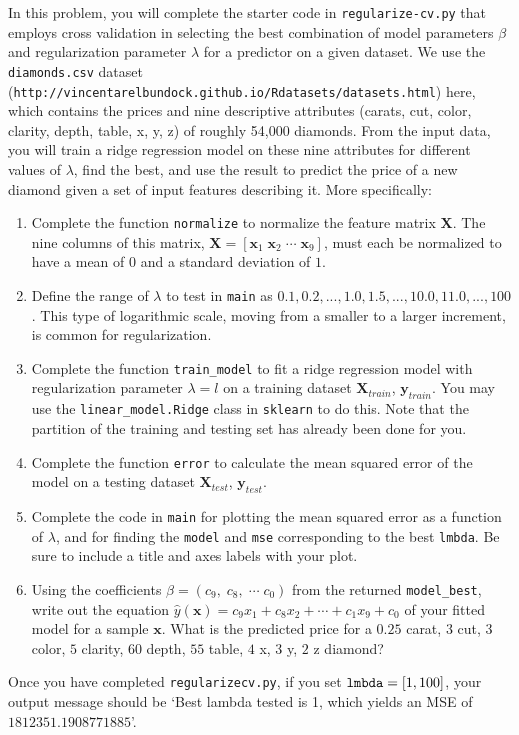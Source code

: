 \documentclass[10pt]{article}
\begin{document}
In this problem, you will complete the starter code in {\tt regularize-cv.py} that employs cross validation in selecting the best combination of model parameters $\beta$ and regularization parameter $\lambda$ for a predictor on a given dataset. We use the {\tt diamonds.csv} dataset ({\tt http://vincentarelbundock.github.io/Rdatasets/datasets.html}) here, which contains the prices and nine descriptive attributes (carats, cut, color, clarity, depth, table, x, y, z) of roughly 54,000 diamonds. From the input data, you will train a ridge regression model on these nine attributes for different values of $\lambda$, find the best, and use the result to predict the price of a new diamond given a set of input features describing it. More specifically:
\begin{enumerate}
\item Complete the function {\tt normalize} to normalize the feature matrix $\mathbf{X}$. The nine columns of this matrix, $\mathbf{X} = [\mathbf{x}_1 \; \mathbf{x}_2 \; \cdots \; \mathbf{x}_9]$, must each be normalized to have a mean of $0$ and a standard deviation of $1$.

\item Define the range of $\lambda$ to test in {\tt main} as $0.1, 0.2, ..., 1.0, 1.5, ..., 10.0, 11.0, ..., 100$. This type of logarithmic scale, moving from a smaller to a larger increment, is common for regularization.

\item Complete the function {\tt train\_model} to fit a ridge regression model with regularization parameter $\lambda = l$ on a training dataset $\mathbf{X}_{train}$, $\mathbf{y}_{train}$. You may use the {\tt linear\_model.Ridge} class in {\tt sklearn} to do this. Note that the partition of the training and testing set has already been done for you.

\item Complete the function {\tt error} to calculate the mean squared error of the model on a testing dataset $\mathbf{X}_{test}$, $\mathbf{y}_{test}$. 

\item Complete the code in {\tt main} for plotting the mean squared error as a function of $\lambda$, and for finding the {\tt model} and {\tt mse} corresponding to the best {\tt lmbda}. Be sure to include a title and axes labels with your plot.

\item Using the coefficients $\beta = (c_9, \;c_8, \; \cdots \; c_0)$ from the returned {\tt model\_best}, write out the equation $\hat{y}(\mathbf{x}) = c_9 x_1 + c_8 x_2 + \cdots + c_1 x_9 + c_0$ of your fitted model for a sample $\mathbf{x}$. What is the predicted price for a $0.25$ carat, $3$ cut, $3$ color, $5$ clarity, $60$ depth, $55$ table, $4$ x, $3$ y, $2$ z diamond?
\end{enumerate}
Once you have completed {\tt regularize\-cv.py}, if you set ${\tt lmbda} = [1, 100]$, your output message should be `Best lambda tested is 1, which yields an MSE of $1812351.1908771885$'.
\end{document}
